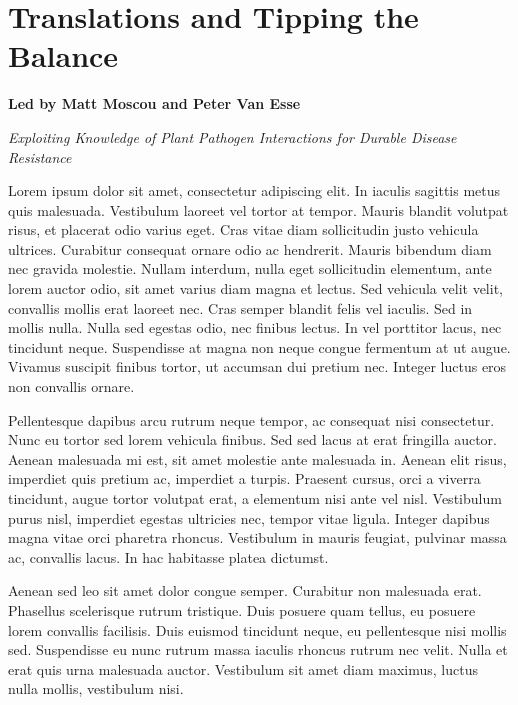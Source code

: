 \documentclass[12pt,]{book}
\begin{document}
\chapter*{Translations and Tipping the
Balance}\label{translations-and-tipping-the-balance}

\textbf{Led by Matt Moscou and Peter Van Esse}

\emph{Exploiting Knowledge of Plant Pathogen Interactions for Durable
Disease Resistance}

Lorem ipsum dolor sit amet, consectetur adipiscing elit. In iaculis
sagittis metus quis malesuada. Vestibulum laoreet vel tortor at tempor.
Mauris blandit volutpat risus, et placerat odio varius eget. Cras vitae
diam sollicitudin justo vehicula ultrices. Curabitur consequat ornare
odio ac hendrerit. Mauris bibendum diam nec gravida molestie. Nullam
interdum, nulla eget sollicitudin elementum, ante lorem auctor odio, sit
amet varius diam magna et lectus. Sed vehicula velit velit, convallis
mollis erat laoreet nec. Cras semper blandit felis vel iaculis. Sed in
mollis nulla. Nulla sed egestas odio, nec finibus lectus. In vel
porttitor lacus, nec tincidunt neque. Suspendisse at magna non neque
congue fermentum at ut augue. Vivamus suscipit finibus tortor, ut
accumsan dui pretium nec. Integer luctus eros non convallis ornare.

Pellentesque dapibus arcu rutrum neque tempor, ac consequat nisi
consectetur. Nunc eu tortor sed lorem vehicula finibus. Sed sed lacus at
erat fringilla auctor. Aenean malesuada mi est, sit amet molestie ante
malesuada in. Aenean elit risus, imperdiet quis pretium ac, imperdiet a
turpis. Praesent cursus, orci a viverra tincidunt, augue tortor volutpat
erat, a elementum nisi ante vel nisl. Vestibulum purus nisl, imperdiet
egestas ultricies nec, tempor vitae ligula. Integer dapibus magna vitae
orci pharetra rhoncus. Vestibulum in mauris feugiat, pulvinar massa ac,
convallis lacus. In hac habitasse platea dictumst.

Aenean sed leo sit amet dolor congue semper. Curabitur non malesuada
erat. Phasellus scelerisque rutrum tristique. Duis posuere quam tellus,
eu posuere lorem convallis facilisis. Duis euismod tincidunt neque, eu
pellentesque nisi mollis sed. Suspendisse eu nunc rutrum massa iaculis
rhoncus rutrum nec velit. Nulla et erat quis urna malesuada auctor.
Vestibulum sit amet diam maximus, luctus nulla mollis, vestibulum nisi.
\end{document}
